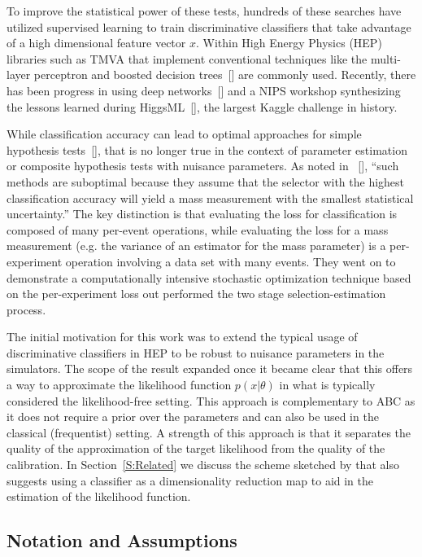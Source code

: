 \documentclass[aoas,preprint]{imsart}
\newcommand{\citek}[1]{[\cite{#1}]}
\numberwithin{equation}{section}
\theoremstyle{plain}
\begin{document}
To improve the statistical power of these tests, hundreds of these searches have utilized supervised learning to train discriminative classifiers that take advantage of a high dimensional feature vector $x$. Within High Energy Physics (HEP) libraries such as TMVA that implement conventional techniques like the multi-layer perceptron and boosted decision trees~\citek{Hocker:2007ht} are commonly used. Recently, there has been progress in using deep networks~\citek{Baldi:2014kfa} and a NIPS workshop synthesizing the lessons learned during HiggsML~\citek{HepML}, the largest Kaggle challenge in history. 

While classification accuracy can lead to optimal approaches for simple hypothesis tests~\citek{Dempster1965}, that is no longer true in the context of parameter estimation or composite hypothesis tests with nuisance parameters. As noted in ~\citek{Whiteson:2006ws}, ``such methods are suboptimal because they assume that the selector with the highest classification accuracy will yield a mass measurement with the smallest statistical uncertainty.''
The key distinction is that evaluating the loss for classification is composed of many per-event operations, while evaluating the loss for a mass measurement (e.g. the variance of an estimator for the mass parameter) is a per-experiment operation involving a data set with many events. They went on to demonstrate a computationally intensive stochastic optimization technique based on the per-experiment loss out performed the two stage selection-estimation process. 

The initial motivation for this work was to extend the typical usage of discriminative classifiers in HEP to be robust to 
nuisance parameters in the simulators. The scope of the result expanded once it became clear that this offers a way to approximate the likelihood function $p(x|\theta)$ in what is typically considered the likelihood-free setting. This approach is complementary to ABC as it does not require a prior over the parameters and can also be used in the classical (frequentist) setting. A strength of this approach is that it separates the quality of the approximation of the target likelihood from the quality of the calibration.  In Section~\ref{S:Related} we discuss the scheme sketched by \cite{Neal:2007zz} that also suggests using a classifier  as a dimensionality reduction map to aid in the estimation of the likelihood function.


  

\subsection{Notation and Assumptions}
\end{document}
